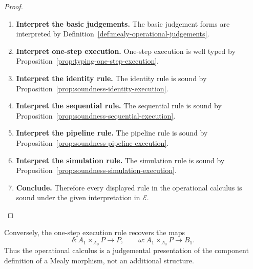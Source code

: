 \begin{proof}
    \leavevmode
    \begin{enumerate}
        \item \textbf{Interpret the basic judgements.}
        The basic judgement forms are interpreted by
        Definition~\ref{def:mealy-operational-judgements}.

        \item \textbf{Interpret one-step execution.}
        One-step execution is well typed by
        Proposition~\ref{prop:typing-one-step-execution}.

        \item \textbf{Interpret the identity rule.}
        The identity rule is sound by
        Proposition~\ref{prop:soundness-identity-execution}.

        \item \textbf{Interpret the sequential rule.}
        The sequential rule is sound by
        Proposition~\ref{prop:soundness-sequential-execution}.

        \item \textbf{Interpret the pipeline rule.}
        The pipeline rule is sound by
        Proposition~\ref{prop:soundness-pipeline-execution}.

        \item \textbf{Interpret the simulation rule.}
        The simulation rule is sound by
        Proposition~\ref{prop:soundness-simulation-execution}.

        \item \textbf{Conclude.}
        Therefore every displayed rule in the operational calculus is sound
        under the given interpretation in \(\mathcal E\).
    \end{enumerate}
\end{proof}

\begin{remark}[Conservativity]
\label{rem:operational-calculus-conservativity}
    Conversely, the one-step execution rule recovers the maps
    \[
        \delta:A_1\times_{A_0}P\to P,
        \qquad
        \omega:A_1\times_{A_0}P\to B_1.
    \]
    Thus the operational calculus is a judgemental presentation of the
    component definition of a Mealy morphism, not an additional structure.
\end{remark}

